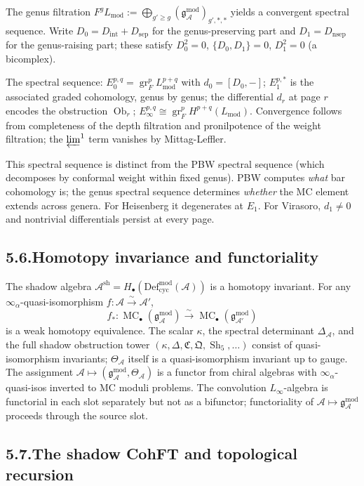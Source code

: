 \documentclass[11pt,reqno]{amsart}
\theoremstyle{definition}
\theoremstyle{remark}
\providecommand{\cA}{\mathcal{A}}
\providecommand{\Defcyc}{\mathrm{Def}_{\mathrm{cyc}}}
\providecommand{\gAmod}{\mathfrak{g}^{\mathrm{mod}}_\cA}
\providecommand{\Defcyc}{\mathrm{Def}_{\mathrm{cyc}}}
\numberwithin{equation}{section}
\begin{document}
The genus filtration $F^g L_{\mathrm{mod}}:=\bigoplus_{g'\ge g}(\gAmod)_{g',*,*}$
yields a convergent spectral sequence. Write
$D_0=D_{\mathrm{int}}+D_{\mathrm{sep}}$ for the genus-preserving part
and $D_1=D_{\mathrm{nsep}}$ for the genus-raising part; these satisfy
$D_0^2=0$, $\{D_0,D_1\}=0$, $D_1^2=0$ (a bicomplex).

The spectral sequence: $E_0^{p,q}=\operatorname{gr}_F^p L_{\mathrm{mod}}^{p+q}$
with $d_0=[D_0,-]$; $E_1^{p,*}$ is the associated graded cohomology,
genus by genus; the differential $d_r$ at page $r$ encodes the
obstruction $\operatorname{Ob}_r$; $E_\infty^{p,q}\cong\operatorname{gr}_F^p H^{p+q}(L_{\mathrm{mod}})$.
Convergence follows from completeness of the depth filtration and
pronilpotence of the weight filtration; the $\varprojlim^1$ term
vanishes by Mittag-Leffler.

This spectral sequence is distinct from the PBW spectral sequence
(which decomposes by conformal weight within fixed genus). PBW
computes \emph{what} bar cohomology is; the genus spectral sequence
determines \emph{whether} the MC element extends across genera. For
Heisenberg it degenerates at $E_1$. For Virasoro, $d_1\neq 0$ and
nontrivial differentials persist at every page.

\subsection*{5.6.\enspace Homotopy invariance and functoriality}

The shadow algebra $\cA^{\mathrm{sh}}=H_\bullet(\Defcyc^{\mathrm{mod}}(\cA))$
is a homotopy invariant. For any $\infty_\alpha$-quasi-isomorphism
$f\colon\cA\xrightarrow{\sim}\cA'$,
\[
f_*\colon\operatorname{MC}_\bullet(\gAmod)\xrightarrow{\;\sim\;}\operatorname{MC}_\bullet(\mathfrak g^{\mathrm{mod}}_{\cA'})
\]
is a weak homotopy equivalence. The scalar $\kappa$, the spectral
determinant $\Delta_\cA$, and the full shadow obstruction tower
$(\kappa,\Delta,\mathfrak C,\mathfrak Q,\operatorname{Sh}_5,\ldots)$
consist of quasi-isomorphism invariants; $\Theta_\cA$ itself is a
quasi-isomorphism invariant up to gauge. The assignment
$\cA\mapsto(\gAmod,\Theta_\cA)$ is a functor from chiral algebras with
$\infty_\alpha$-quasi-isos inverted to MC moduli problems. The
convolution $L_\infty$-algebra is functorial in each slot separately
but not as a bifunctor; functoriality of $\cA\mapsto\gAmod$ proceeds
through the source slot.

\subsection*{5.7.\enspace The shadow CohFT and topological recursion}
\end{document}
